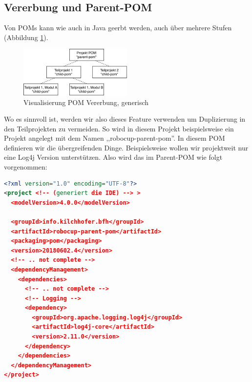 \subsection{Vererbung und Parent-POM}

Von POMs kann wie auch in Java geerbt werden, auch über mehrere Stufen (Abbildung \ref{fig:grundlagen-pom-vererbung}).
\begin{figure}[H]
	\centering
	\includegraphics[width=0.5\textwidth]{img/maven-pom-inheritance-generic.pdf}
	\caption{Visualisierung POM Vererbung, generisch}
	\label{fig:grundlagen-pom-vererbung}
\end{figure}
Wo es sinnvoll ist, werden wir also dieses Feature verwenden um Duplizierung in den Teilprojekten zu vermeiden. So wird in diesem Projekt beispielsweise ein Projekt angelegt mit dem Namen ,,robocup-parent-pom''. In diesem POM definieren wir die übergreifenden Dinge. Beispielsweise wollen wir projektweit nur eine Log4j Version unterstützen. Also wird das im Parent-POM wie folgt vorgenommen:
\begin{lstlisting}[language=XML, caption={Ausschnitt aus dem Parent-POM},label={lst:maven-parent-pom}]
<?xml version="1.0" encoding="UTF-8"?>
<project <!-- (generiert die IDE) --> >
  <modelVersion>4.0.0</modelVersion>

  <groupId>info.kilchhofer.bfh</groupId>
  <artifactId>robocup-parent-pom</artifactId>
  <packaging>pom</packaging>
  <version>20180602.4</version>
  <!-- .. not complete -->
  <dependencyManagement>
    <dependencies>
      <!-- .. not complete -->
      <!-- Logging -->
      <dependency>
        <groupId>org.apache.logging.log4j</groupId>
        <artifactId>log4j-core</artifactId>
        <version>2.11.0</version>
      </dependency>
    </dependencies>
  </dependencyManagement>
</project>
\end{lstlisting}

